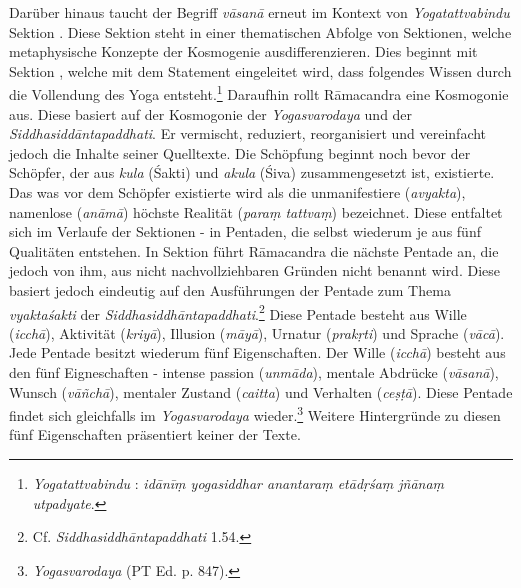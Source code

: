    Darüber hinaus taucht der Begriff \textit{vāsanā} erneut im Kontext von \textit{Yogatattvabindu} Sektion . Diese Sektion steht in einer thematischen Abfolge von Sektionen, welche metaphysische Konzepte der Kosmogenie ausdifferenzieren. Dies beginnt mit Sektion , welche mit dem Statement eingeleitet wird, dass folgendes Wissen durch die Vollendung des Yoga entsteht.\footnote{\textit{Yogatattvabindu} : \textit{idānīṃ yogasiddhar anantaraṃ etādṛśaṃ jñānaṃ utpadyate}.} Daraufhin rollt Rāmacandra eine Kosmogonie aus. Diese basiert auf der Kosmogonie der \textit{Yogasvarodaya} und der \textit{Siddhasiddāntapaddhati}. Er vermischt, reduziert, reorganisiert und vereinfacht jedoch die Inhalte seiner Quelltexte. Die Schöpfung beginnt noch bevor der Schöpfer, der aus \textit{kula} (Śakti) und \textit{akula} (Śiva) zusammengesetzt ist, existierte. Das was vor dem Schöpfer existierte wird als die unmanifestiere (\textit{avyakta}), namenlose (\textit{anāmā}) höchste Realität (\textit{paraṃ tattvaṃ}) bezeichnet. Diese entfaltet sich im Verlaufe der Sektionen  -  in Pentaden, die selbst wiederum je aus fünf Qualitäten entstehen. In Sektion  führt Rāmacandra die nächste Pentade an, die jedoch von ihm, aus nicht nachvollziehbaren Gründen nicht benannt wird. Diese basiert jedoch eindeutig auf den Ausführungen der Pentade zum Thema \textit{vyaktaśakti} der \textit{Siddhasiddhāntapaddhati}.\footnote{Cf. \textit{Siddhasiddhāntapaddhati} 1.54.} Diese Pentade besteht aus Wille (\textit{icchā}), Aktivität (\textit{kriyā}), Illusion (\textit{māyā}), Urnatur (\textit{prakṛti}) und Sprache (\textit{vācā}). Jede Pentade besitzt wiederum fünf Eigenschaften. Der Wille (\textit{icchā}) besteht aus den fünf Eigneschaften -  intense passion (\textit{unmāda}), mentale Abdrücke (\textit{vāsanā}), Wunsch (\textit{vāñchā}), mentaler Zustand (\textit{caitta}) und Verhalten (\textit{ceṣṭā}). Diese Pentade findet sich gleichfalls im \textit{Yogasvarodaya} wieder.\footnote{\textit{Yogasvarodaya} (PT Ed. p. 847).} Weitere Hintergründe zu diesen fünf Eigenschaften präsentiert keiner der Texte. \\

